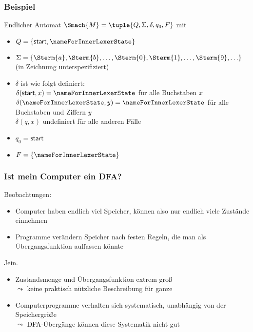 \documentclass[aspectratio=1610,onlymath]{beamer}
\begin{document}
\begin{frame}\frametitle{Beispiel}


Endlicher Automat $\Smach{M}=\tuple{Q,\Sigma,\delta,q_0,F}$ mit 
\begin{itemize}
\item $Q=\{ \textsf{start},\allowbreak\textsf{\nameForInnerLexerState}\}$
\item $\Sigma=\{\Sterm{a},\Sterm{b},\ldots,\Sterm{0},\Sterm{1},\ldots,\Sterm{9},\ldots\}$ (in Zeichnung unterspezifiziert)
\item $\delta$ ist wie folgt definiert:\\
	$\delta(\textsf{start},x)=\textsf{\nameForInnerLexerState}$ für alle Buchstaben $x$\\
	$\delta(\textsf{\nameForInnerLexerState},y)=\textsf{\nameForInnerLexerState}$ für alle Buchstaben und Ziffern $y$\\
	$\delta(q,x)$ undefiniert für alle anderen Fälle
\item $q_0= \textsf{start}$
\item $F=\{\textsf{\nameForInnerLexerState}\}$
\end{itemize}


\end{frame}

\begin{frame}\frametitle{Ist mein Computer ein DFA?}

Beobachtungen:
\begin{itemize}
\item Computer haben endlich viel Speicher, können also nur endlich viele Zustände einnehmen
\item Programme verändern Speicher nach festen Regeln, die man als Übergangsfunktion auffassen könnte
\end{itemize}

\pause

\bigskip
Jein.
\begin{itemize}
\item Zustandsmenge und Übergangsfunktion extrem groß\\
$\leadsto$ keine praktisch nützliche Beschreibung für ganze 
\item Computerprogramme verhalten sich systematisch, unabhängig von der Speichergröße\\
$\leadsto$ DFA-Übergänge können diese Systematik nicht gut 
\end{itemize}

\end{frame}
\end{document}
